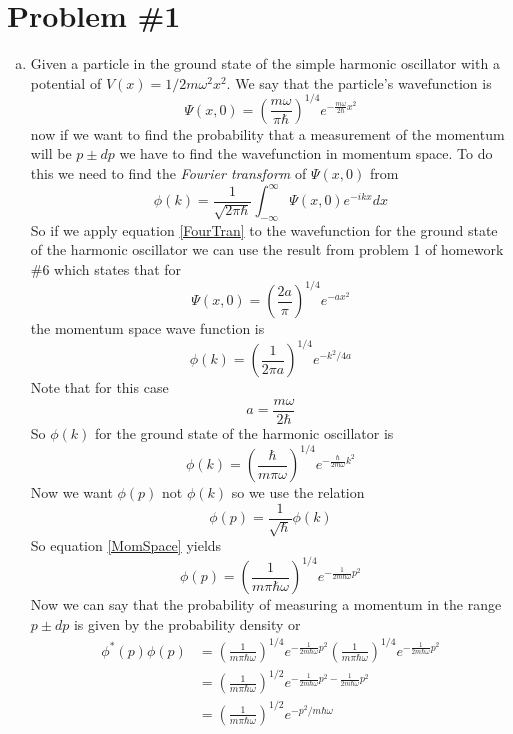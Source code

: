 \documentclass[11pt]{article}
\numberwithin{equation}{section}
\begin{document}


\section{Problem \#1}
\begin{enumerate}[(a)]
\item
Given a particle in the ground state of the simple harmonic oscillator with a potential of $V(x) = 1/2m\omega^2x^2$. We say that the particle's wavefunction is
$$\Psi(x,0) = \left(\frac{m\omega}{\pi\hbar}\right)^{1/4}e^{-\frac{m\omega}{2\hbar}x^2}$$
now if we want to find the probability that a measurement of the momentum will be $p\pm dp$ we have to find the wavefunction in momentum space. To do this we need to find the \emph{Fourier transform} of $\Psi(x,0)$ from
\begin{equation}
\phi(k) = \frac{1}{\sqrt{2\pi\hbar}}\int_{-\infty}^{\infty}\Psi(x,0)e^{-ikx}dx
\label{FourTran}
\end{equation}
So if we apply equation \ref{FourTran} to the wavefunction for the ground state of the harmonic oscillator we can use the result from problem 1 of homework \#6 which states that for 
$$\Psi(x,0) = \left(\frac{2a}{\pi}\right)^{1/4}e^{-ax^2}$$
the momentum space wave function is 
$$\phi(k) = \left(\frac{1}{2\pi a}\right)^{1/4}e^{-k^2/4a}$$
Note that for this case 
$$a = \frac{m\omega}{2\hbar}$$
So $\phi(k)$ for the ground state of the harmonic oscillator is
$$\phi(k) = \left(\frac{\hbar}{m\pi\omega}\right)^{1/4}e^{-\frac{\hbar}{2m\omega}k^2}$$
Now we want $\phi(p)$ not $\phi(k)$ so we use the relation
\begin{equation} 
\phi(p) = \frac{1}{\sqrt{\hbar}}\phi(k)
\label{MomSpace} 
\end{equation} 
So equation \ref{MomSpace} yields
$$\phi(p) = \left(\frac{1}{m\pi\hbar\omega}\right)^{1/4}e^{-\frac{1}{2m\hbar\omega}p^2}$$
Now we can say that the probability of measuring a momentum in the range $p\pm dp$ is given by the probability density or
\begin{align*}
\phi^*(p)\phi(p) &= \left(\frac{1}{m\pi\hbar\omega}\right)^{1/4}e^{-\frac{1}{2m\hbar\omega}p^2}\left(\frac{1}{m\pi\hbar\omega}\right)^{1/4}e^{-\frac{1}{2m\hbar\omega}p^2}\\
&= \left(\frac{1}{m\pi\hbar\omega}\right)^{1/2}e^{-\frac{1}{2m\hbar\omega}p^2-\frac{1}{2m\hbar\omega}p^2}\\
&= \left(\frac{1}{m\pi\hbar\omega}\right)^{1/2}e^{-p^2/{m\hbar\omega}}
\end{align*}


\end{enumerate}
\end{document}
